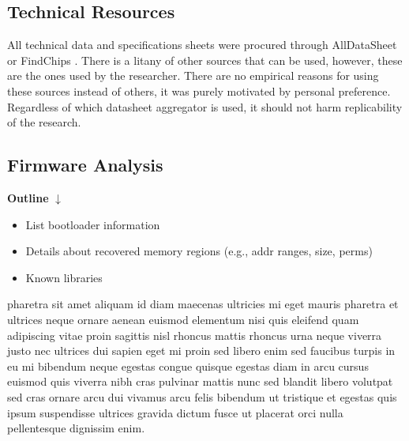 \subsection{Technical Resources} \label{technicalresources}




All technical data and specifications sheets were procured through AllDataSheet or FindChips \autocite{ALLDATASHEETCOMElectronic,FindchipsElectronicPart}. There is a litany of other sources that can be used, however, these are the ones used by the researcher. There are no empirical reasons for using these sources instead of others, it was purely motivated by personal preference. Regardless of which datasheet aggregator is used, it should not harm replicability of the research.

\subsection{Firmware Analysis} \label{firmwareanalysis}

\textbf{Outline}
$\downarrow$

\begin{itemize}
    \item List bootloader information
    \item Details about recovered memory regions (e.g., addr ranges, size, perms)
    \item Known libraries
\end{itemize}

pharetra sit amet aliquam id diam maecenas ultricies mi eget mauris pharetra et ultrices neque ornare aenean euismod elementum nisi quis eleifend quam adipiscing vitae proin sagittis nisl rhoncus mattis rhoncus urna neque viverra justo nec ultrices dui sapien eget mi proin sed libero enim sed faucibus turpis in eu mi bibendum neque egestas congue quisque egestas diam in arcu cursus euismod quis viverra nibh cras pulvinar mattis nunc sed blandit libero volutpat sed cras ornare arcu dui vivamus arcu felis bibendum ut tristique et egestas quis ipsum suspendisse ultrices gravida dictum fusce ut placerat orci nulla pellentesque dignissim enim.

